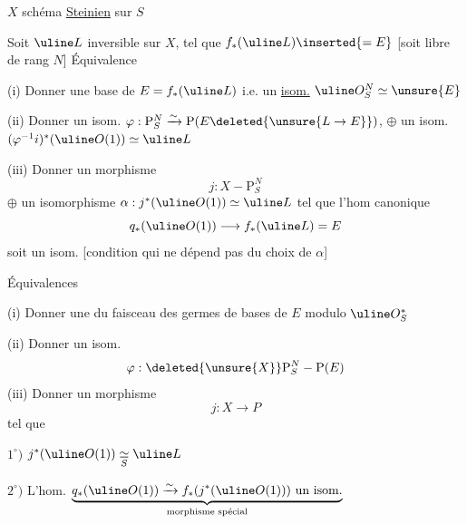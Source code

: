 $X$ schéma \uline{Steinien} sur $S$

 Soit $\uline L$ inversible sur $X$, tel que $f_*(\uline L)\inserted{=E}$ [soit libre de rang $N$]
Équivalence

(i) Donner une base de $E=f_*(\uline L)$ i.e. un \uline{isom.} $\uline O_S^N\simeq\unsure{E}$

(ii) Donner un isom. $\varphi:\mathrm P_S^N\xrightarrow{\sim}\mathrm P(E\deleted{\unsure{L\to E}})$, $\oplus$ un isom.
$(\varphi^{-1}i)^*(\uline O(1))\simeq\uline L$

(iii) Donner un  morphisme
\[
j:X-\mathrm P_S^N
\]
$\oplus$ un isomorphisme $\alpha:j^*(\uline O(1))\simeq\uline L$
tel que l'hom canonique
\[
q_*(\uline O(1))\longrightarrow f_*(\uline L)=E
\]
soit un isom. [condition qui ne dépend pas du choix de $\alpha$]


Équivalences

(i) Donner une  du faisceau des germes de bases de $E$ modulo $\uline O_S^*$

(ii) Donner un isom. 
\[
\varphi:\deleted{\unsure{X}}\mathrm P_S^N-\mathrm P(E)
\]
(iii) Donner un morphisme
\[
j:X\longrightarrow P
\]
tel que

$1^\circ)$ $j^*(\uline O(1))\underset S\simeq\uline L$ 

$2^\circ)$ L'hom. $\underbrace{q_*(\uline O(1))\xrightarrow{\sim}f_*(j^*(\uline O(1)))\ \text{un isom.}}_{\text{morphisme spécial}}$

